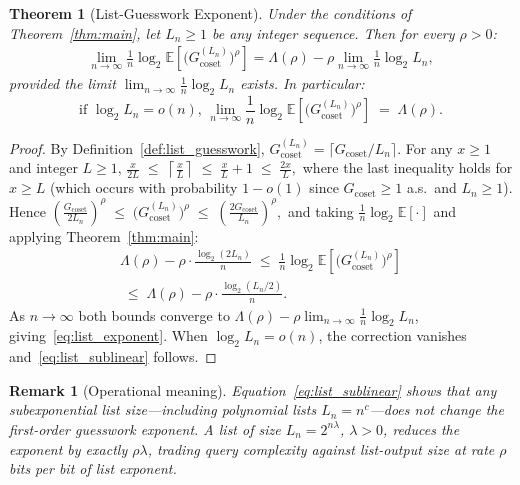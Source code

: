 \documentclass[journal,10pt,onecolumn]{IEEEtran}
\newtheorem{theorem}{Theorem}
\newtheorem{remark}{Remark}
\newcommand{\Eb}{\mathbb{E}}
\begin{document}
\begin{theorem}[List-Guesswork Exponent]
\label{thm:list}
Under the conditions of Theorem~\ref{thm:main}, let $L_n\ge 1$ be
any integer sequence.  Then for every $\rho>0$:
\begin{align}
    \lim_{n\to\infty}
    \frac{1}{n}\log_2\Eb\left[\bigl(G_{\mathrm{coset}}^{(L_n)}\bigr)^{\!\rho}\right]=
    \Lambda(\rho)-\rho\lim_{n\to\infty}\frac{1}{n}\log_2 L_n,
    \label{eq:list_exponent}
\end{align}
provided the limit $\lim_{n\to\infty}\frac{1}{n}\log_2 L_n$ exists.
In particular:
\begin{equation}
    \text{if }\log_2 L_n = o(n),\,
    \lim_{n\to\infty}
    \frac{1}{n}\log_2\Eb\!\left[\bigl(G_{\mathrm{coset}}^{(L_n)}\bigr)^{\!\rho}\right]
    \;=\;
    \Lambda(\rho).
\label{eq:list_sublinear}
\end{equation}
\end{theorem}

\begin{proof}
By Definition~\ref{def:list_guesswork},
$G_{\mathrm{coset}}^{(L_n)}=\lceil G_{\mathrm{coset}}/L_n\rceil$.
For any $x\ge 1$ and integer $L\ge 1$,
\(
    \frac{x}{2L}\;\le\;\left\lceil\frac{x}{L}\right\rceil\;\le\;\frac{x}{L}+1\;\le\;\frac{2x}{L},
\)
where the last inequality holds for $x\ge L$ (which occurs with
probability $1-o(1)$ since $G_{\mathrm{coset}}\ge 1$ a.s.\ and $L_n\ge 1$).
Hence
\(
    \left(\frac{G_{\mathrm{coset}}}{2L_n}\right)^{\!\rho}
    \;\le\;
    \bigl(G_{\mathrm{coset}}^{(L_n)}\bigr)^{\!\rho}
    \;\le\;
    \left(\frac{2G_{\mathrm{coset}}}{L_n}\right)^{\!\rho},
\)
and taking $\frac{1}{n}\log_2\Eb[\cdot]$ and applying
Theorem~\ref{thm:main}:
\begin{align}
    \Lambda(\rho)-\rho\cdot\frac{\log_2(2L_n)}{n}
    \;\le\;
    \frac{1}{n}\log_2\Eb\!\left[\bigl(G_{\mathrm{coset}}^{(L_n)}\bigr)^{\!\rho}\right] \nonumber \\
    \;\le\;
    \Lambda(\rho)-\rho\cdot\frac{\log_2(L_n/2)}{n}.
\end{align}
As $n\to\infty$ both bounds converge to
$\Lambda(\rho)-\rho\lim_{n\to\infty}\frac{1}{n}\log_2 L_n$,
giving~\eqref{eq:list_exponent}.
When $\log_2 L_n=o(n)$, the correction vanishes and~\eqref{eq:list_sublinear}
follows.
\end{proof}

\begin{remark}[Operational meaning]
Equation~\eqref{eq:list_sublinear} shows that any \emph{subexponential}
list size---including polynomial lists $L_n=n^c$---does not change the
first-order guesswork exponent.  A list of size $L_n=2^{n\lambda}$,
$\lambda>0$, reduces the exponent by exactly $\rho\lambda$, trading
query complexity against list-output size at rate $\rho$ bits per
bit of list exponent.
\end{remark}
\end{document}
